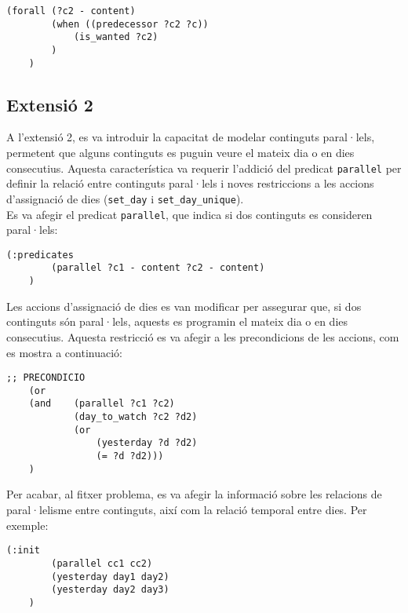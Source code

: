 \documentclass[a4paper]{article}
\begin{document}
	\begin{lstlisting}[language=PDDL, caption={Fragment per assignar més d'un predecessor com a pendent de veure}, label={lst:extensio1}]
	(forall (?c2 - content)
		(when ((predecessor ?c2 ?c))
			(is_wanted ?c2)
		)
	)
	\end{lstlisting}
	
	\subsection{Extensió 2}
	
	A l'extensió 2, es va introduir la capacitat de modelar continguts paral·lels, permetent que alguns continguts es puguin veure el mateix dia o en dies consecutius. Aquesta característica va requerir l'addició del predicat \texttt{parallel} per definir la relació entre continguts paral·lels i noves restriccions a les accions d'assignació de dies (\texttt{set\_day} i \texttt{set\_day\_unique}).\\
	
	Es va afegir el predicat \texttt{parallel}, que indica si dos continguts es consideren paral·lels:
	\begin{lstlisting}[language=PDDL, caption={Definició del predicat \texttt{parallel}}, label={lst:predicatParallel}]
	(:predicates
		(parallel ?c1 - content ?c2 - content)
	)
	\end{lstlisting}
	
	Les accions d'assignació de dies es van modificar per assegurar que, si dos continguts són paral·lels, aquests es programin el mateix dia o en dies consecutius. Aquesta restricció es va afegir a les precondicions de les accions, com es mostra a continuació:
	
	\begin{lstlisting}[language=PDDL, caption={Restriccions per continguts paral·lels}, label={lst:extensio2}]
	;; PRECONDICIO
	(or
	(and 	(parallel ?c1 ?c2)
		 	(day_to_watch ?c2 ?d2)
		 	(or
				(yesterday ?d ?d2)
				(= ?d ?d2)))
	)
	\end{lstlisting}
	
	Per acabar, al fitxer problema, es va afegir la informació sobre les relacions de paral·lelisme entre continguts, així com la relació temporal entre dies. Per exemple:
	\begin{lstlisting}[language=PDDL, caption={Inicialització de paral·lels i dies consecutius}, label={lst:iniExtensio2}]
	(:init
		(parallel cc1 cc2)
		(yesterday day1 day2)
		(yesterday day2 day3)
	)
	\end{lstlisting}
	
\end{document}
